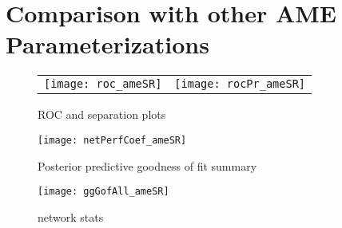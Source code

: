 \section{Comparison with other AME Parameterizations}



% 

\begin{figure}[ht]
	\centering
	\begin{tabular}{cc}
	\texttt{[image: roc\_ameSR]} & 
	\texttt{[image: rocPr\_ameSR]}
	\end{tabular}
	\caption{ROC and separation plots}
	\label{fig:roc_latentSpace}
\end{figure}

\begin{figure}[ht]
	\centering
	\texttt{[image: netPerfCoef\_ameSR]}
	\caption{Posterior predictive goodness of fit summary}
	\label{fig:netPerfCoef_ameSR}
\end{figure}

\begin{figure}[ht]
	\centering
	\texttt{[image: ggGofAll\_ameSR]}
	\caption{network stats }
	\label{fig:gofAll_ameSR}
\end{figure}
\FloatBarrier

% 
% 



